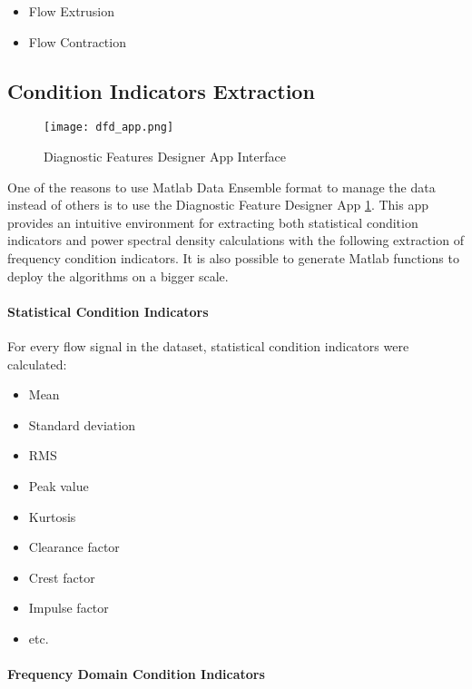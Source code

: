 \begin{itemize}
    \item Flow Extrusion
    \item Flow Contraction
\end{itemize}

\subsection{Condition Indicators Extraction}

\begin{figure}[h!]
    \centering
    \texttt{[image: dfd\_app.png]}
    \caption{Diagnostic Features Designer App Interface}
    \label{fig:dfd_app}
\end{figure}

One of the reasons to use Matlab Data Ensemble format to manage the data
instead of others is to use the Diagnostic Feature Designer App
\ref{fig:dfd_app}.
This app provides an intuitive environment for extracting both statistical
condition indicators and power spectral density calculations with the
following extraction of frequency condition indicators. It is also possible
to generate Matlab functions to deploy the algorithms on a bigger scale.

\paragraph{Statistical Condition Indicators}

For every flow signal in the dataset, statistical condition indicators were calculated: 
\begin{itemize}
    \item Mean
    \item Standard deviation
    \item RMS
    \item Peak value
    \item Kurtosis
    \item Clearance factor
    \item Crest factor
    \item Impulse factor
    \item etc.
\end{itemize}


\paragraph{Frequency Domain Condition Indicators}


